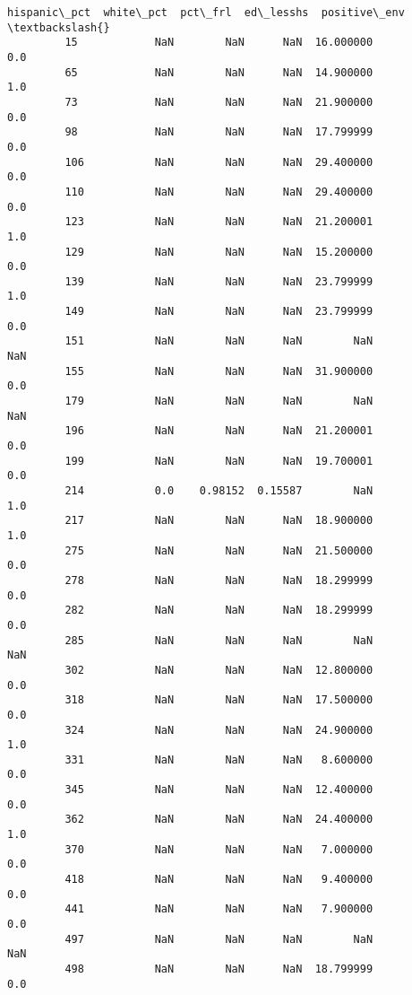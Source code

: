 \documentclass[11pt]{article}
\begin{document}
\begin{Verbatim}[commandchars=\\\{\}]
              hispanic\_pct  white\_pct  pct\_frl  ed\_lesshs  positive\_env  \textbackslash{}
         15            NaN        NaN      NaN  16.000000           0.0   
         65            NaN        NaN      NaN  14.900000           1.0   
         73            NaN        NaN      NaN  21.900000           0.0   
         98            NaN        NaN      NaN  17.799999           0.0   
         106           NaN        NaN      NaN  29.400000           0.0   
         110           NaN        NaN      NaN  29.400000           0.0   
         123           NaN        NaN      NaN  21.200001           1.0   
         129           NaN        NaN      NaN  15.200000           0.0   
         139           NaN        NaN      NaN  23.799999           1.0   
         149           NaN        NaN      NaN  23.799999           0.0   
         151           NaN        NaN      NaN        NaN           NaN   
         155           NaN        NaN      NaN  31.900000           0.0   
         179           NaN        NaN      NaN        NaN           NaN   
         196           NaN        NaN      NaN  21.200001           0.0   
         199           NaN        NaN      NaN  19.700001           0.0   
         214           0.0    0.98152  0.15587        NaN           1.0   
         217           NaN        NaN      NaN  18.900000           1.0   
         275           NaN        NaN      NaN  21.500000           0.0   
         278           NaN        NaN      NaN  18.299999           0.0   
         282           NaN        NaN      NaN  18.299999           0.0   
         285           NaN        NaN      NaN        NaN           NaN   
         302           NaN        NaN      NaN  12.800000           0.0   
         318           NaN        NaN      NaN  17.500000           0.0   
         324           NaN        NaN      NaN  24.900000           1.0   
         331           NaN        NaN      NaN   8.600000           0.0   
         345           NaN        NaN      NaN  12.400000           0.0   
         362           NaN        NaN      NaN  24.400000           1.0   
         370           NaN        NaN      NaN   7.000000           0.0   
         418           NaN        NaN      NaN   9.400000           0.0   
         441           NaN        NaN      NaN   7.900000           0.0   
         497           NaN        NaN      NaN        NaN           NaN   
         498           NaN        NaN      NaN  18.799999           0.0   
         

\end{Verbatim}
\end{document}
